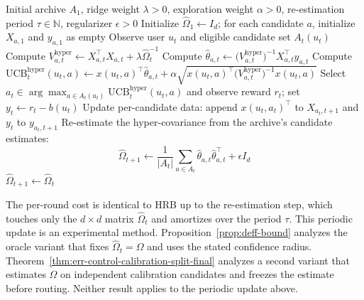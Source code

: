 \documentclass{article} %
\begin{document}
\begin{algorithm}[t]
\caption{HyperRidge-Periodic (HRP): routing with periodic covariance updates}
\label{alg:hyper-ridge}
\begin{algorithmic}[1]
\Require Initial archive $A_1$, ridge weight $\lambda > 0$, exploration
  weight $\alpha > 0$, re-estimation period $\tau \in \mathbb{N}$,
  regularizer $\epsilon > 0$
\State Initialize $\widehat{\Omega}_1 \gets I_d$; for each candidate $a$,
  initialize $X_{a,1}$ and $y_{a,1}$ as empty
  \State Observe user $u_t$ and eligible candidate set $A_t(u_t)$
    \State Compute
      $V_{a,t}^{\mathrm{hyper}} \gets X_{a,t}^\top X_{a,t}
        + \lambda \widehat{\Omega}_t^{-1}$
    \State Compute
      $\widehat{\theta}_{a,t} \gets
        \bigl( V_{a,t}^{\mathrm{hyper}} \bigr)^{-1}
        X_{a,t}^\top y_{a,t}$
    \State Compute
      $\mathrm{UCB}_t^{\mathrm{hyper}}(u_t, a) \gets
        x(u_t, a)^\top \widehat{\theta}_{a,t}
        + \alpha \sqrt{ x(u_t, a)^\top
          \bigl( V_{a,t}^{\mathrm{hyper}} \bigr)^{-1} x(u_t, a) }$
  \EndFor
  \State Select
    $a_t \in \arg\max_{a \in A_t(u_t)} \mathrm{UCB}_t^{\mathrm{hyper}}(u_t, a)$
    and observe reward $r_t$; set $y_t\gets r_t-b(u_t)$
  \State Update per-candidate data: append $x(u_t, a_t)^\top$ to
    $X_{a_t, t+1}$ and $y_t$ to $y_{a_t, t+1}$
    \State Re-estimate the hyper-covariance from the archive's
      candidate estimates:
      \begin{equation}
        \widehat{\Omega}_{t+1} \gets
          \frac{1}{|A_t|} \sum_{a \in A_t}
          \widehat{\theta}_{a,t} \widehat{\theta}_{a,t}^\top
          + \epsilon I_d
      \end{equation}
  \Else
    \State $\widehat{\Omega}_{t+1} \gets \widehat{\Omega}_t$
  \EndIf
\EndFor
\end{algorithmic}
\end{algorithm}

The per-round cost is identical to HRB up to the
re-estimation step, which touches only the $d \times d$ matrix
$\widehat{\Omega}_t$ and amortizes over the period $\tau$. This periodic update
is an experimental method. Proposition~\ref{prop:deff-bound} analyzes the
oracle variant that fixes $\widehat\Omega_t=\Omega$ and uses the stated
confidence radius. Theorem~\ref{thm:err-control-calibration-split-final}
analyzes a second variant that estimates $\Omega$ on independent calibration
candidates and freezes the estimate before routing. Neither result applies to
the periodic update above.
\end{document}
